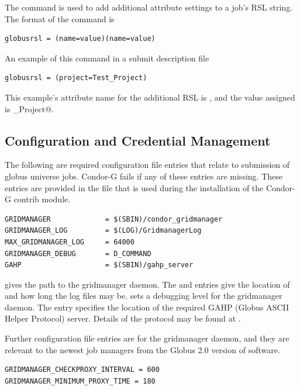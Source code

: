 The  command is used to add additional
attribute settings to a job's RSL string.
The format of the  command is
\begin{verbatim}
globusrsl = (name=value)(name=value)
\end{verbatim}
An example of this command in a submit description file
\begin{verbatim}
globusrsl = (project=Test_Project)
\end{verbatim}
This example's attribute name for the additional RSL is
\verb@project@, and the value assigned is \verb@Test_Project@.

\subsection{\label{sec:Condor-G-Credentials}Configuration and Credential Management}

The following are required configuration file entries that
relate to submission of globus universe jobs.
Condor-G fails if any of these entries are missing.
These entries are provided in the file
that is used during the installation of the Condor-G contrib module.

\begin{verbatim}
GRIDMANAGER             = $(SBIN)/condor_gridmanager
GRIDMANAGER_LOG         = $(LOG)/GridmanagerLog
MAX_GRIDMANAGER_LOG     = 64000
GRIDMANAGER_DEBUG       = D_COMMAND
GAHP                    = $(SBIN)/gahp_server
\end{verbatim} 

gives the path to the gridmanager daemon.
The 
and
entries give the location of and how long
the log files may be.
sets a debugging level for the gridmanager daemon.
The
 entry specifies the location of the required
GAHP (Globus ASCII Helper Protocol) server.
Details of the protocol may be found at
.

Further configuration file entries are for the gridmanager daemon,
and they are relevant to
the newest job managers from the Globus 2.0 version of software.
\begin{verbatim}
GRIDMANAGER_CHECKPROXY_INTERVAL = 600
GRIDMANAGER_MINIMUM_PROXY_TIME = 180
\end{verbatim} 

